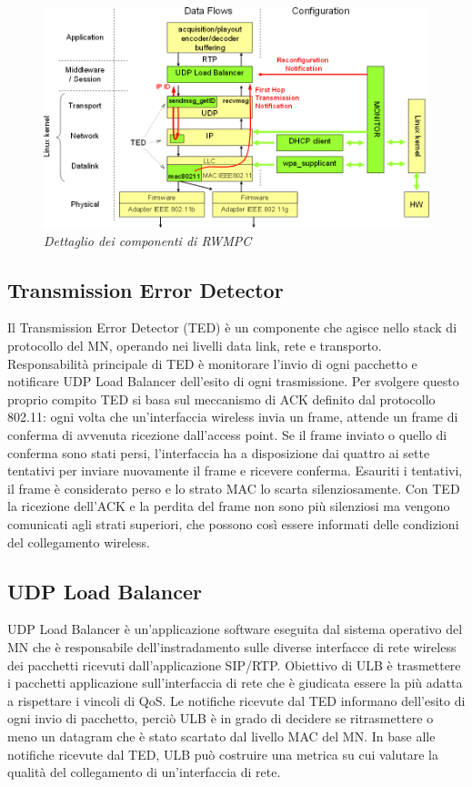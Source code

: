 \documentclass[12pt,a4paper,openright,twoside]{book}
\begin{document}
\begin{figure}
  \centering
  \includegraphics[width=\textwidth]{img/abps-rwmpc-funzionamento}
  \caption{\em Dettaglio dei componenti di RWMPC}
  \label{fig:abps:rwmpc-funzionamento}
\end{figure}

\subsection{Transmission Error Detector}

Il Transmission Error Detector (TED) è un componente che agisce nello
stack di protocollo del MN, operando nei livelli data link, rete e
transporto. Responsabilità principale di TED è monitorare l'invio di
ogni pacchetto e notificare UDP Load Balancer dell'esito di ogni
trasmissione. Per svolgere questo proprio compito TED si basa sul
meccanismo di ACK definito dal protocollo 802.11: ogni volta che
un'interfaccia wireless invia un frame, attende un frame di conferma
di avvenuta ricezione dall'access point. Se il frame inviato o quello
di conferma sono stati persi, l'interfaccia ha a disposizione dai
quattro ai sette tentativi per inviare nuovamente il frame e ricevere
conferma. Esauriti i tentativi, il frame è considerato perso e lo
strato MAC lo scarta silenziosamente. Con TED la ricezione dell'ACK e
la perdita del frame non sono più silenziosi ma vengono comunicati
agli strati superiori, che possono così essere informati delle
condizioni del collegamento wireless.

\subsection{UDP Load Balancer}

UDP Load Balancer è un'applicazione software eseguita dal sistema
operativo del MN che è responsabile dell'instradamento sulle diverse
interfacce di rete wireless dei pacchetti ricevuti dall'applicazione
SIP/RTP. Obiettivo di ULB è trasmettere i pacchetti applicazione
sull'interfaccia di rete che è giudicata essere la più adatta a
rispettare i vincoli di QoS. Le notifiche ricevute dal TED informano
dell'esito di ogni invio di pacchetto, perciò ULB è in grado di
decidere se ritrasmettere o meno un datagram che è stato scartato dal
livello MAC del MN. In base alle notifiche ricevute dal TED, ULB può
costruire una metrica su cui valutare la qualità del collegamento di
un'interfaccia di rete.
\end{document}
